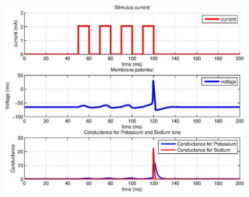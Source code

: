 \documentclass[12pt]{article}
\newenvironment{exercise}[2][Exercise]{\begin{trivlist}
\item[\hskip \labelsep {\bfseries #1}\hskip \labelsep {\bfseries #2.}]}{\end{trivlist}}
\begin{document}
\begin{exercise}{2.2}
\begin{enumerate}
  \includegraphics[width=5in]{resspiking.eps}

\end{enumerate}

\end{exercise}
 
\end{document}
